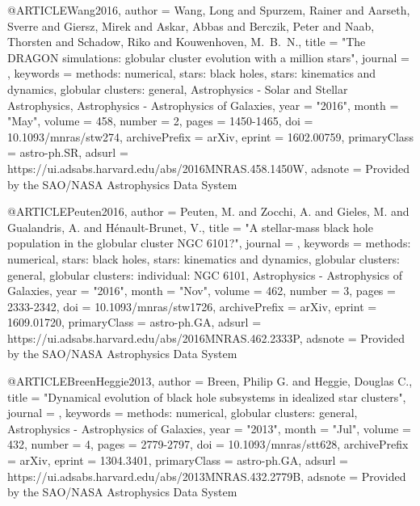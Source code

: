 \documentclass[twocolumn,tighten]{aastex63}
\begin{document}
@ARTICLE{Wang2016,
       author = {{Wang}, Long and {Spurzem}, Rainer and {Aarseth}, Sverre and
         {Giersz}, Mirek and {Askar}, Abbas and {Berczik}, Peter and
         {Naab}, Thorsten and {Schadow}, Riko and {Kouwenhoven}, M.~B.~N.},
        title = "{The DRAGON simulations: globular cluster evolution with a million stars}",
      journal = {\mnras},
     keywords = {methods: numerical, stars: black holes, stars: kinematics and dynamics, globular clusters: general, Astrophysics - Solar and Stellar Astrophysics, Astrophysics - Astrophysics of Galaxies},
         year = "2016",
        month = "May",
       volume = {458},
       number = {2},
        pages = {1450-1465},
          doi = {10.1093/mnras/stw274},
archivePrefix = {arXiv},
       eprint = {1602.00759},
 primaryClass = {astro-ph.SR},
       adsurl = {https://ui.adsabs.harvard.edu/abs/2016MNRAS.458.1450W},
      adsnote = {Provided by the SAO/NASA Astrophysics Data System}
}

@ARTICLE{Peuten2016,
       author = {{Peuten}, M. and {Zocchi}, A. and {Gieles}, M. and {Gualandris}, A. and
         {H{\'e}nault-Brunet}, V.},
        title = "{A stellar-mass black hole population in the globular cluster NGC 6101?}",
      journal = {\mnras},
     keywords = {methods: numerical, stars: black holes, stars: kinematics and dynamics, globular clusters: general, globular clusters: individual: NGC 6101, Astrophysics - Astrophysics of Galaxies},
         year = "2016",
        month = "Nov",
       volume = {462},
       number = {3},
        pages = {2333-2342},
          doi = {10.1093/mnras/stw1726},
archivePrefix = {arXiv},
       eprint = {1609.01720},
 primaryClass = {astro-ph.GA},
       adsurl = {https://ui.adsabs.harvard.edu/abs/2016MNRAS.462.2333P},
      adsnote = {Provided by the SAO/NASA Astrophysics Data System}
}


@ARTICLE{BreenHeggie2013,
       author = {{Breen}, Philip G. and {Heggie}, Douglas C.},
        title = "{Dynamical evolution of black hole subsystems in idealized star clusters}",
      journal = {\mnras},
     keywords = {methods: numerical, globular clusters: general, Astrophysics - Astrophysics of Galaxies},
         year = "2013",
        month = "Jul",
       volume = {432},
       number = {4},
        pages = {2779-2797},
          doi = {10.1093/mnras/stt628},
archivePrefix = {arXiv},
       eprint = {1304.3401},
 primaryClass = {astro-ph.GA},
       adsurl = {https://ui.adsabs.harvard.edu/abs/2013MNRAS.432.2779B},
      adsnote = {Provided by the SAO/NASA Astrophysics Data System}
}
\end{document}
